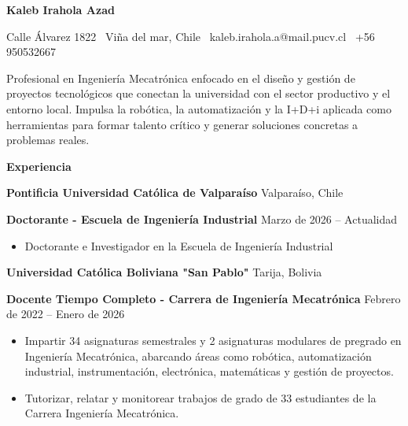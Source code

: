 \documentclass[11pt]{article}
\begin{document}
	\begin{center}
		\textbf{Kaleb Irahola Azad}\\ 
		\hrulefill
	\end{center}
	
	\begin{center}
		Calle {Álvarez 1822} \textbullet\ Viña del mar, Chile \textbullet\ kaleb.irahola.a@mail.pucv.cl \textbullet\ +56 950532667
	\end{center}
	
	\vspace{0.5pt}
	
	Profesional en Ingeniería Mecatrónica enfocado en el diseño y gestión de proyectos tecnológicos que conectan la universidad con el sector productivo y el entorno local. Impulsa la robótica, la automatización y la I+D+i aplicada como herramientas para formar talento crítico y generar soluciones concretas a problemas reales.
	
	\vspace{0.5pt}
	
	\begin{center}
		\textbf{Experiencia}
	\end{center}
	\textbf{Pontificia Universidad Católica de Valparaíso} \hfill Valparaíso, Chile
	
	\textbf{Doctorante - Escuela de Ingeniería Industrial} \hfill Marzo de 2026 – Actualidad
	\begin{itemize}[noitemsep, topsep=0pt, partopsep=0pt, parsep=0pt]
		\item Doctorante e Investigador en la Escuela de Ingeniería Industrial
	\end{itemize}
	
	\textbf{Universidad Católica Boliviana "San Pablo"} \hfill Tarija, Bolivia
	
	\textbf{Docente Tiempo Completo - Carrera de Ingeniería Mecatrónica} \hfill Febrero de 2022 – Enero de 2026
	\begin{itemize}[noitemsep, topsep=0pt, partopsep=0pt, parsep=0pt]
		\item Impartir 34 asignaturas semestrales y 2 asignaturas modulares de pregrado en Ingeniería Mecatrónica, abarcando áreas como robótica, automatización industrial, instrumentación, electrónica, matemáticas y gestión de proyectos.
		\item Tutorizar, relatar y monitorear trabajos de grado de 33 estudiantes de la Carrera Ingeniería Mecatrónica.
	\end{itemize}
	
\end{document}
